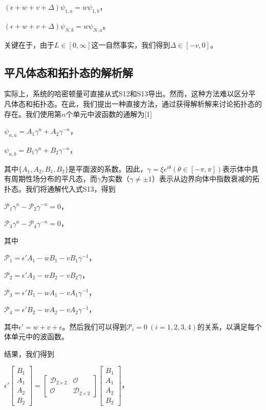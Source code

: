 \((\epsilon + w + v + \Delta)\psi_{1,a} = w\psi_{1,b}\)，

\((\epsilon + w + v + \Delta)\psi_{N,b} = w\psi_{N,a}\)。

关键在于，由于\(L \in [0,\infty]\)这一自然事实，我们得到\(\Delta \in [-v,0]\)。


\subsection{平凡体态和拓扑态的解析解}

实际上，系统的哈密顿量可直接从式S12和S13导出。然而，这种方法难以区分平凡体态和拓扑态。在此，我们提出一种直接方法，通过获得解析解来讨论拓扑态的存在。我们使用第\(n\)个单元中波函数的通解为[1]

\(\psi_{n,a}=A_{1}\gamma^{n}+A_{2}\gamma^{-n}\)，

\(\psi_{n,b}=B_{1}\gamma^{n}+B_{2}\gamma^{-n}\)，

其中\(\{A_{1},A_{2},B_{1},B_{2}\}\)是平面波的系数。因此，\(\gamma=\xi e^{i\theta}(\theta\in[-\pi,\pi])\)表示体中具有周期性场分布的平凡态，而\(\gamma\)为实数（\(\gamma\neq\pm1\)）表示从边界向体中指数衰减的拓扑态。我们将通解代入式S13，得到

\(\mathcal{P}_{1}\gamma^{n}-\mathcal{P}_{2}\gamma^{-n}=0\)，

\(\mathcal{P}_{3}\gamma^{n}-\mathcal{P}_{4}\gamma^{-n}=0\)，

其中

\(\mathcal{P}_{1}=\epsilon'A_{1}-wB_{1}-vB_{1}\gamma^{-1}\)，

\(\mathcal{P}_{2}=\epsilon'A_{2}-wB_{2}-vB_{2}\gamma\)，

\(\mathcal{P}_{3}=\epsilon'B_{1}-wA_{1}-vA_{1}\gamma^{-1}\)，

\(\mathcal{P}_{4}=\epsilon'B_{2}-wA_{2}-vA_{2}\gamma^{-1}\)，

其中\(\epsilon' = w + v + \epsilon\)。然后我们可以得到\(\mathcal{P}_{i}=0\ (i = 1,2,3,4)\)的关系，以满足每个体单元中的波函数。

结果，我们得到

\(\epsilon'\begin{bmatrix}B_{1}\\A_{1}\\A_{2}\\B_{2}\end{bmatrix}=\begin{bmatrix}\mathcal{D}_{2\times2}&\mathcal{O}\\\mathcal{O}&\mathcal{D}_{2\times2}\end{bmatrix}\begin{bmatrix}B_{1}\\A_{1}\\A_{2}\\B_{2}\end{bmatrix}\)，


